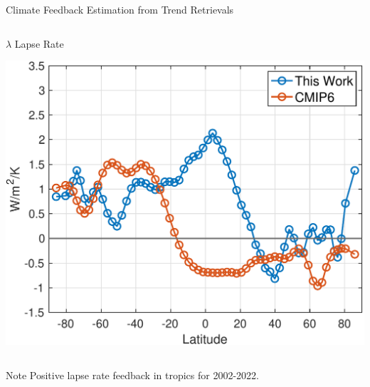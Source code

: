 \documentclass[10pt,t]{beamer}
\begin{document}
\begin{frame}{Climate Feedback Estimation from Trend Retrievals}
\begin{columns}
\begin{column}{0.5\columnwidth}
\begin{block}{\(\lambda\) Lapse Rate}
\vspace{-0.1in}
\begin{center}
\includegraphics[width=\linewidth]{SunClimate2022/lapselamda2.pdf}
\end{center}
\end{block}
\end{column}
\end{columns}

\vspace{-0.05in}
Note Positive lapse rate feedback in tropics for 2002-2022.
\end{frame}
\end{document}
